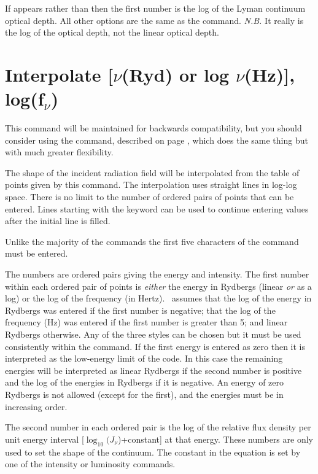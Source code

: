 If  appears rather than
 then the first number is
the log of the Lyman continuum optical depth.
All other options are the same as the
 command.
\emph{N.B.} It really is the log of the optical depth,
not the linear optical depth.

\section{Interpolate [$\nu$(Ryd) or log $\nu$(Hz)], log(f$_\nu$)}

This command will be maintained for backwards compatibility,
but you should consider using the  command,
described on page \pageref{sec:CommandTableSED}, 
which does the same thing but with much greater flexibility.

The shape of the incident radiation field will be interpolated from
the table of points given
by this command.
The interpolation uses straight lines in log-log space.
There is no limit to the number of ordered pairs of points that can be entered.
Lines starting with the keyword  can be used to continue entering values after
the initial  line is filled.

Unlike the majority of the commands the first five characters of the
command must be entered.

The numbers are ordered pairs giving the energy and intensity.
The first number within each ordered pair of points is \emph{either}
the energy in Rydbergs
(linear \emph{or} as a log) or the log of the frequency (in Hertz).  \Cloudy\ assumes
that the log of the energy in Rydbergs was entered if the first number is
negative; that the log of the frequency (Hz) was entered
if the first number
is greater than 5; and linear Rydbergs otherwise.
Any of the three styles
can be chosen but it must be used consistently within the command.
If the
first energy is entered as zero then it is interpreted as the low-energy
limit of the code.
In this case the remaining energies will be interpreted
as linear Rydbergs if the second number is positive and the log of the
energies in Rydbergs if it is negative.
An energy of zero Rydbergs is not
allowed (except for the first),
and the energies must be in increasing order.

The second number in each ordered pair is the log of the relative flux
density per unit energy interval [$\log_{10}(J_\nu$)+constant] at that energy.
These
numbers are only used to set the shape of the continuum.
The constant in
the equation is set by one of the intensity or luminosity commands.

